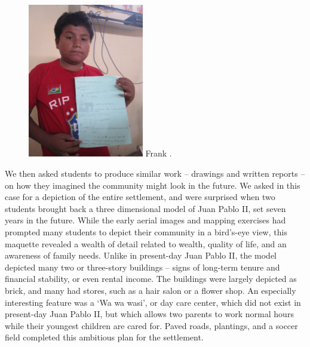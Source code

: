 \documentclass[11pt]{report}
\begin{document}
\begin{figure}
	\begin{flushright}
		\includegraphics[width=0.45\textwidth]{images/juan-pablo-frank.jpg}
		Frank .
	\end{flushright}
\end{figure}

We then asked students to produce similar work -- drawings and written reports -- on how they imagined the community might look in the future. We asked in this case for a depiction of the entire settlement, and were surprised when two students brought back a three dimensional model of Juan Pablo II, set seven years in the future. While the early aerial images and mapping exercises had prompted many students to depict their community in a bird's-eye view, this maquette revealed a wealth of detail related to wealth, quality of life, and an awareness of family needs. Unlike in present-day Juan Pablo II, the model depicted many two or three-story buildings -- signs of long-term tenure and financial stability, or even rental income. The buildings were largely depicted as brick, and many had stores, such as a hair salon or a flower shop. An especially interesting feature was a `Wa wa wasi', or day care center, which did not exist in present-day Juan Pablo II, but which allows two parents to work normal hours while their youngest children are cared for. Paved roads, plantings, and a soccer field completed this ambitious plan for the settlement.
\end{document}
